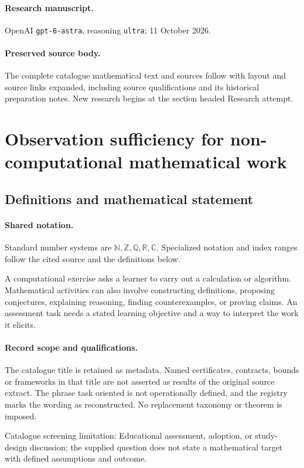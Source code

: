 \documentclass[11pt]{article}
\begin{document}
\paragraph{Research manuscript.} OpenAI \texttt{gpt-6-astra}, reasoning \texttt{ultra}; 11 October 2026.
\paragraph{Preserved source body.} The complete catalogue mathematical text and sources follow with layout and source links expanded, including source qualifications and its historical preparation notes. New research begins at the section headed Research attempt.

\section{Observation sufficiency for non-computational mathematical work}\label{statement}

\subsection{Definitions and mathematical statement}

\paragraph{Shared notation.}Standard number systems are $\mathbb N,\mathbb Z,\mathbb Q,\mathbb R,\mathbb C$. Specialized notation and index ranges follow the cited source and the definitions below.


A computational exercise asks a learner to carry out a calculation or algorithm. Mathematical activities can also involve constructing definitions, proposing conjectures, explaining reasoning, finding counterexamples, or proving claims. An assessment task needs a stated learning objective and a way to interpret the work it elicits.
\paragraph{Record scope and qualifications.}
The catalogue title is retained as metadata. Named certificates, contracts, bounds or frameworks in that title are not asserted as results of the original source extract.
The phrase task oriented is not operationally defined, and the registry marks the wording as reconstructed. No replacement taxonomy or theorem is imposed.

Catalogue screening limitation: Educational assessment, adoption, or study-design discussion; the supplied question does not state a mathematical target with defined assumptions and outcome.
\end{document}
